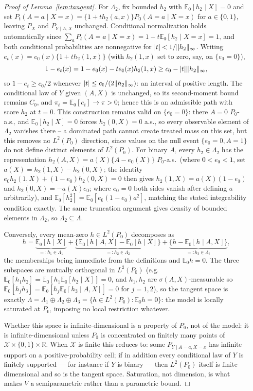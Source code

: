 \documentclass[11pt]{article}
\theoremstyle{plain}
\theoremstyle{definition}
\theoremstyle{remark}
\newcommand{\E}{\mathbb{E}}
\newcommand{\R}{\mathbb{R}}
\newcommand{\cX}{\mathcal{X}}
\newcommand{\ez}{e_0}
\newcommand{\Linf}[1]{\lVert #1 \rVert_{\infty}}
\DeclarePairedDelimiter{\abs}{\lvert}{\rvert}
\begin{document}
\begin{proof}[Proof of Lemma~\ref{lem:tangent}]
For $\Lambda_2$, fix bounded $h_2$ with $\E_0[h_2\mid X]=0$ and set
$P_t(A=a\mid X=x)=\{1+th_2(a,x)\}P_0(A=a\mid X=x)$ for $a\in\{0,1\}$,
leaving $P_X$ and $P_{Y\mid A,X}$ unchanged. Conditional normalization holds
automatically since $\sum_aP_t(A=a\mid X=x)=1+t\E_0[h_2\mid X=x]=1$, and
both conditional probabilities are nonnegative for $\abs t<1/\Linf{h_2}$.
Writing $e_t(x)=\ez(x)\{1+th_2(1,x)\}$ (with $h_2(1,x)$ set to zero, say,
on $\{\ez=0\}$),
\[
  1-e_t(x)=1-\ez(x)-t\ez(x)h_2(1,x)\ge c_0-\abs t\Linf{h_2},
\]
so $1-e_t\ge c_0/2$ whenever $\abs t\le c_0/(2\Linf{h_2})$: an interval of
positive length. The conditional law of $Y$ given $(A,X)$ is unchanged, so
its second-moment bound remains $C_0$, and $\pi_t=\E_0[e_t]\to\pi>0$; hence
this is an admissible path with score $h_2$ at $t=0$. This construction
remains valid on $\{\ez=0\}$: there $A=0$ $P_0$-a.s., and
$\E_0[h_2\mid X]=0$ forces $h_2(0,X)=0$ a.s., so every observable element
of $\Lambda_2$ vanishes there -- a dominated path cannot create treated
mass on this set, but this removes no $L^2(P_0)$ direction, since values on
the null event $\{\ez=0,A=1\}$ do not define distinct elements of
$L^2(P_0)$. For binary $A$, every $h_2\in\Lambda_2$ has the representation
$h_2(A,X)=a(X)\{A-\ez(X)\}$ $P_0$-a.s.\ (where $0<\ez<1$, set
$a(X)=h_2(1,X)-h_2(0,X)$; the identity
$\ez h_2(1,X)+(1-\ez)h_2(0,X)=0$ then gives
$h_2(1,X)=a(X)(1-\ez)$ and $h_2(0,X)=-a(X)\ez$; where $\ez=0$ both sides
vanish after defining $a$ arbitrarily), and $\E_0[h_2^2]=\E_0[\ez(1-\ez)a^2]$,
matching the stated integrability condition exactly. The same truncation
argument gives density of bounded elements in $\Lambda_2$, so
$\Lambda_2\subseteq\Lambda$.

Conversely, every mean-zero $h\in L^2(P_0)$ decomposes as
\[
  h=\underbrace{\E_0[h\mid X]}_{=:h_1\in\Lambda_1}
   +\underbrace{\bigl\{\E_0[h\mid A,X]-\E_0[h\mid X]\bigr\}}_{=:h_2\in\Lambda_2}
   +\underbrace{\bigl\{h-\E_0[h\mid A,X]\bigr\}}_{=:h_3\in\Lambda_3},
\]
the memberships being immediate from the definitions and $\E_0h=0$. The
three subspaces are mutually orthogonal in $L^2(P_0)$ (e.g.\
$\E_0[h_1h_2]=\E_0[h_1\E_0[h_2\mid X]]=0$, and $h_1,h_2$ are
$\sigma(A,X)$-measurable so $\E_0[h_jh_3]=\E_0[h_j\E_0[h_3\mid A,X]]=0$ for
$j=1,2$), so the tangent space is exactly
$\Lambda=\Lambda_1\oplus\Lambda_2\oplus\Lambda_3=\{h\in L^2(P_0):\E_0h=0\}$:
the model is locally saturated at $P_0$, imposing no local restriction
whatever.

Whether this space is infinite-dimensional is a property of $P_0$, not of
the model: it is infinite-dimensional unless $P_0$ is concentrated on
finitely many points of $\cX\times\{0,1\}\times\R$. When $\cX$ is finite
this reduces to: some $P_{Y\mid A=a,X=x}$ has infinite support on a
positive-probability cell; if in addition every conditional law of $Y$ is
finitely supported --- for instance if $Y$ is binary --- then $L^2(P_0)$
itself is finite-dimensional and so is the tangent space. Saturation, not
dimension, is what makes $V$ a semiparametric rather than a parametric
bound.


\end{proof}
\end{document}
